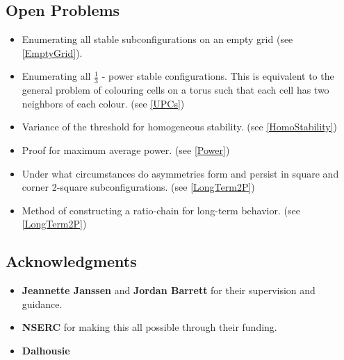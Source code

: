 \documentclass[12pt]{article}
\theoremstyle{definition}
\theoremstyle{remark}
\theoremstyle{remark}
\begin{document}
\subsection{Open Problems}
\begin{itemize}
\item
Enumerating all stable subconfigurations on an empty grid (see \ref{EmptyGrid}).
\item
Enumerating all $\frac{1}{3}$ - power stable configurations. This is equivalent to the general problem of colouring cells on a torus such that each cell has two neighbors of each colour. (see \ref{UPCs})
\item
Variance of the threshold for homogeneous stability. (see \ref{HomoStability})
\item
Proof for maximum average power. (see \ref{Power})
\item
Under what circumstances do asymmetries form and persist in square and corner 2-square subconfigurations. (see \ref{LongTerm2P})
\item
Method of constructing a ratio-chain for long-term behavior. (see \ref{LongTerm2P})

\end{itemize}

\subsection{Acknowledgments}
\begin{itemize}
\item \textbf{Jeannette Janssen} and \textbf{Jordan Barrett} for their supervision and guidance. 
\item \textbf{NSERC} for making this all possible through their funding.
\item \textbf{Dalhousie}
\end{itemize}


{}
\end{document}
